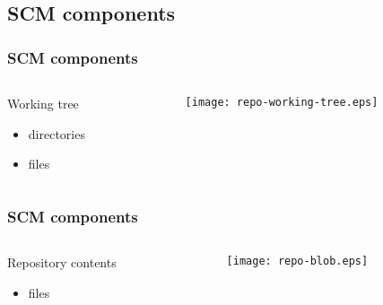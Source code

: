 \documentclass[english]{beamer}
\newcommand{\mysubsection}[2]{
  \hypertarget{#2}{}
  \subsection{#1}
  \label{#2}
}
\begin{document}
\mysubsection{SCM components}{concepts:components}
\begin{frame}
\frametitle{SCM components}
\begin{columns}[t]
        \begin{column}[T]{.5\textwidth}
                Working tree
                \begin{itemize}
                        \item directories
                        \item files
                \end{itemize}

        \end{column}
        \begin{column}[T]{.5\textwidth}
                \vspace{.2\textheight}
                \texttt{[image: repo-working-tree.eps]}
        \end{column}
\end{columns}

\end{frame}

\begin{frame}
\frametitle{SCM components}
\begin{columns}[t]
        \begin{column}[T]{.5\textwidth}
                Repository contents
                \begin{itemize}
                        \item files
                \end{itemize}
        \end{column}
        \begin{column}[T]{.5\textwidth}
                \vspace{.2\textheight}
                \texttt{[image: repo-blob.eps]}
        \end{column}
\end{columns}

\end{frame}
\end{document}
